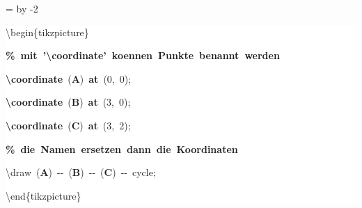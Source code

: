 \begingroup
\ttfamily
{}
=\textwidth
\advance{} by -2\fboxsep
\noindent
\colorbox{background}
{%
\parbox{\dimen255}
{%
\rule[-0.5ex]{0pt}{2.5ex}\hspace*{0.0em}\textbackslash{}begin\{tikzpicture\}\\
\rule[-0.5ex]{0pt}{2.5ex}\hspace*{1.0em}\textcolor{G}{\textbf{\%~mit~'\textbackslash{}coordinate'~koennen~Punkte~benannt~werden}}\\
\rule[-0.5ex]{0pt}{2.5ex}\hspace*{1.0em}\textcolor{R}{\textbf{\textbackslash{}coordinate}}~(\textcolor{B}{\textbf{A}})~\textcolor{R}{\textbf{at}}~(0,~0);\\
\rule[-0.5ex]{0pt}{2.5ex}\hspace*{1.0em}\textcolor{R}{\textbf{\textbackslash{}coordinate}}~(\textcolor{B}{\textbf{B}})~\textcolor{R}{\textbf{at}}~(3,~0);\\
\rule[-0.5ex]{0pt}{2.5ex}\hspace*{1.0em}\textcolor{R}{\textbf{\textbackslash{}coordinate}}~(\textcolor{B}{\textbf{C}})~\textcolor{R}{\textbf{at}}~(3,~2);\\
\rule[-0.5ex]{0pt}{2.5ex}\hspace*{1.0em}\textcolor{G}{\textbf{\%~die~Namen~ersetzen~dann~die~Koordinaten}}\\
\rule[-0.5ex]{0pt}{2.5ex}\hspace*{1.0em}\textbackslash{}draw~(\textcolor{B}{\textbf{A}})~{-}{-}~(\textcolor{B}{\textbf{B}})~{-}{-}~(\textcolor{B}{\textbf{C}})~{-}{-}~cycle;\\
\rule[-0.5ex]{0pt}{2.5ex}\hspace*{0.0em}\textbackslash{}end\{tikzpicture\}}%
}%
\endgroup

